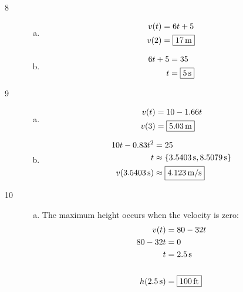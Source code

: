 \documentclass[letterpaper, landscape]{exam}
\begin{document}
\begin{description}
\begin{enumerate}[(a)]
      \end{enumerate}

    \item[8]
      \begin{enumerate}[(a)]
        \item 
          \begin{align*}
            v(t) & = 6t + 5 \\
            v(2) & = \boxed{ \unit[17]{m} } \\
          \end{align*}

        \item
          \begin{align*}
            6t + 5 & = 35 \\
            t      & = \boxed{ \unit[5]{s} } \\
          \end{align*}
      \end{enumerate}

    \item[9]
      \begin{enumerate}[(a)]
        \item 
          \begin{align*}
            v(t) & = 10 - 1.66t \\
            v(3) & = \boxed{ \unit[5.03]{m} } \\
          \end{align*}

        \item
          \begin{align*}
            10 t - 0.83 t^2     & = 25 \\
            t                   & \approx \{ \unit[3.5403]{s}, \unit[8.5079]{s} \}
            \\
            v(\unit[3.5403]{s}) & \approx \boxed{ \unit[4.123]{m/s} }
          \end{align*}

      \end{enumerate}
      
    \item[10]
      \begin{enumerate}[(a)]
        \item 
          The maximum height occurs when the velocity is zero:
          \begin{align*}
            v(t)             & = 80 - 32t \\
            80 - 32t         & = 0 \\
            t                & = \unit[2.5]{s} \\
            \\
            h(\unit[2.5]{s}) & = \boxed{ \unit[100]{ft} } \\
          \end{align*}


\end{enumerate}
\end{description}
\end{document}
